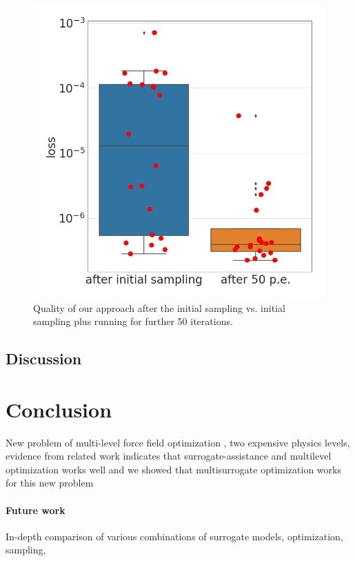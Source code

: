 \documentclass[preprint,12pt]{elsarticle}
\begin{document}
\begin{figure}[h]
\caption{Quality of our approach after the initial sampling vs. initial sampling plus running for further 50 iterations.}
\centering
\includegraphics[scale=0.3]{images/two_staged_performancef.png}
\end{figure}


\subsection{Discussion}
\section{Conclusion}
New problem of multi-level force field optimization , two expensive physics levels, evidence from related work indicates that surrogate-assistance and multilevel optimization works well and we showed that multisurrogate optimization works for this new problem

\paragraph{Future work}
In-depth comparison of various combinations of surrogate models, optimization, sampling, 
\end{document}
